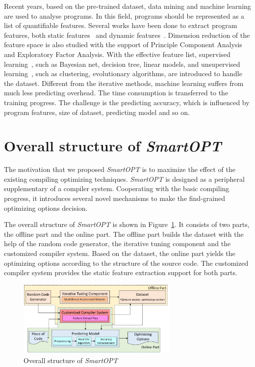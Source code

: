 \documentclass[bst/sn-mathphys]{sn-jnl}%
\theoremstyle{thmstyleone}%
\theoremstyle{thmstyletwo}%
\theoremstyle{thmstylethree}%
\begin{document}
Recent years, based on the pre-trained dataset, data mining and machine 
learning are used to analyse programs. In this field, programs should 
be represented as a list of quantifiable features. 
Several works have been done to extract program features, both static 
features~\cite{fursin2011milepost,ferrante1987program,allen1970control,
park2012using} and dynamic features~\cite{mahlke1992effective,
cavazos2007rapidly,luk2005pin,hoste2007microarchitecture}. Dimension reduction 
of the feature space is also studied with the support of Principle Component 
Analysis and Exploratory Factor Analysis. With the effective feature list, 
supervised learning~\cite{ashouri2016cobayn,ding2015autotuning,
cosenza2017stencil}, such as Bayesian net, decision tree, linear models, and 
unsupervised learning~\cite{martins2014exploration,kulkarni2012mitigating}, 
such as clustering, evolutionary algorithms, are introduced to handle the 
dataset. Different from the iterative methods, machine learning suffers from 
much less predicting overhead. The time consumption is transferred to the 
training progress. The challenge is the predicting 
accuracy, which is influenced by program features, size of dataset, predicting 
model and so on.


\section{Overall structure of \emph{SmartOPT}}\label{sec3}

The motivation that we proposed \emph{SmartOPT} is to maximize the effect of 
the existing compiling optimizing techniques. \emph{SmartOPT} is designed as a 
peripheral supplementary of a compiler system. Cooperating with 
the basic compiling progress, it introduces several novel mechanisms to make 
the find-grained optimizing options decision. 

The overall structure of 
\emph{SmartOPT} is shown in Figure~\ref{FIG1}. It consists of two parts, the 
offline part and the online part. The offline part builds the dataset with the 
help of the random code generator, the iterative tuning component and the 
customized compiler system. Based on the dataset, the online part yields the 
optimizing options according to the structure of the source code. The 
customized compiler system provides the static feature extraction support for 
both parts.

\begin{figure}[h]%
\centering
\includegraphics[width=0.7\textwidth]{fig/fig1.pdf}
\caption{Overall structure of \emph{SmartOPT}}\label{FIG1}
\end{figure}
\end{document}
